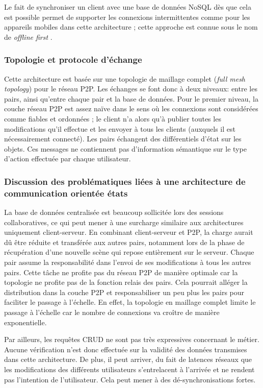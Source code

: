 Le fait de synchroniser un client avec une base de données NoSQL dès que cela 
est possible permet de supporter les connexions intermittentes comme pour les 
appareils mobiles dans cette architecture ; cette approche est connue sous le nom 
de \og\textit{offline first}\fg{} \cite{Gadea2016}.
\subsubsection{Topologie et protocole d'échange}
Cette architecture est basée sur une topologie de maillage complet (\textit{full 
mesh topology}) pour le réseau \gls{P2P}.
Les échanges se font donc à deux niveaux: entre les pairs, ainsi qu'entre chaque 
pair et la base de données. Pour le premier niveau, la couche réseau \gls{P2P} est 
assez 
naïve dans le sens où les connexions sont considérées comme fiables et 
ordonnées ; le client n'a alors qu'à publier toutes les modifications qu'il effectue et 
les envoyer à tous les clients (auxquels il est nécessairement connecté).
Les pairs échangent des différentiels d'état sur les objets. Ces messages ne 
contiennent pas d'information sémantique sur le type d'action effectuée par chaque 
utilisateur. 

\subsubsection{Discussion des problématiques liées à une architecture de 
communication orientée \og états\fg{}}

La base de données centralisée est beaucoup sollicitée lors des sessions 
collaboratives, ce qui peut mener à une surcharge similaire aux architectures 
uniquement client-serveur. 
En combinant client-serveur et \gls{P2P}, la charge aurait dû être réduite et 
transférée aux autres pairs, notamment lors de la phase de récupération d'une 
nouvelle scène qui repose entièrement sur le serveur. 
Chaque pair assume la responsabilité dans l'envoi de ses modifications à tous les 
autres pairs. Cette tâche ne profite pas du réseau \gls{P2P} de manière optimale 
car la topologie ne profite pas de la fonction relais des pairs. Cela pourrait alléger  la 
distribution dans la couche \gls{P2P} et responsabiliser un peu plus les pairs pour 
faciliter le passage à l'échelle.
En effet, la topologie en maillage complet limite le passage à l'échelle car le 
nombre de connexions va croître de manière exponentielle. 

Par ailleurs, les requêtes \gls{CRUD} ne sont pas très expressives concernant le 
métier. 
Aucune vérification n'est donc effectuée sur la validité des données transmises 
dans cette architecture. De plus, il peut arriver, du fait de latences réseaux que les 
modifications des différents utilisateurs s'entrelacent à l'arrivée et ne rendent pas 
l'intention de l'utilisateur. Cela peut mener à des dé-synchronisations fortes.

